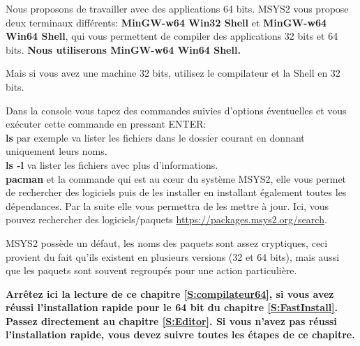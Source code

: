 \documentclass{article}
\begin{document}
Nous proposons de travailler avec des applications 64 bits. MSYS2 vous propose deux terminaux différents: \textbf{MinGW-w64 Win32 Shell} et \textbf{MinGW-w64 Win64 Shell}, qui vous permettent de compiler des applications 32 bits et 64 bits. {\color{MidnightBlue}\textbf{Nous utiliserons MinGW-w64 Win64 Shell.}}

Mais si vous avez une machine 32 bits, utilisez le compilateur et la Shell en 32 bits.

\begin{tcolorbox}[width=\textwidth,colframe=black,colback={white},title={Quelques rudiments de l'utilisation de la ligne de commande dans une console.},outer arc=0mm,colupper=black]    
      Dans la console vous tapez des commandes suivies d'options éventuelles et vous exécuter cette commande en pressant ENTER: \\
\newline
\textbf{ls} par exemple va lister les fichiers dans le dossier courant en donnant uniquement leurs noms. \\
\textbf{ls -l} va lister les fichiers avec plus d'informations.\\
\newline
\textbf{pacman} et la commande qui est au cœur du système MSYS2, elle vous permet de rechercher des logiciels puis de les installer en installant également toutes les dépendances. Par la suite elle vous permettra de les mettre à jour. Ici, vous pouvez rechercher des logiciels/paquets \href{https://packages.msys2.org/search}{https://packages.msys2.org/search}.
\end{tcolorbox}
 
MSYS2 possède un défaut, les noms des paquets sont assez cryptiques, ceci provient du fait qu'ils existent en plusieurs versions (32 et 64 bits), mais aussi que les paquets sont souvent regroupés pour une action particulière.

\textbf{\color{Bittersweet}Arrêtez ici la lecture de ce chapitre \ref{S:compilateur64}, si vous avez réussi l'installation rapide pour le 64 bit du chapitre \ref{S:FastInstall}. Passez directement au chapitre \ref{S:Editor}. Si vous n'avez pas réussi l'installation rapide, vous devez suivre toutes les étapes de ce chapitre.}
\end{document}
